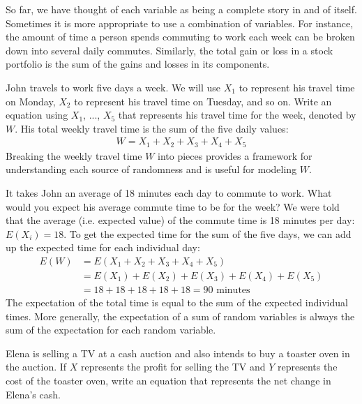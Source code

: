 So far, we have thought of each variable as being a complete story in and of itself. Sometimes it is more appropriate to use a combination of variables. For instance, the amount of time a person spends commuting to work each week can be broken down into several daily commutes. Similarly, the total gain or loss in a stock portfolio is the sum of the gains and losses in its components.

\begin{examplewrap}
\begin{nexample}{John travels to work five days a week. We will use $X_1$ to represent his travel time on Monday, $X_2$ to represent his travel time on Tuesday, and so on. Write an equation using $X_1$, ..., $X_5$ that represents his travel time for the week, denoted by $W$.}
His total weekly travel time is the sum of the five daily values:
\begin{align*}
W = X_1 + X_2 + X_3 + X_4 + X_5
\end{align*}
Breaking the weekly travel time $W$ into pieces provides a framework for understanding each source of randomness and is useful for modeling $W$.
\end{nexample}
\end{examplewrap}

\D{\newpage}

\begin{examplewrap}
\begin{nexample}{It takes John an average of 18 minutes each day to commute to work. What would you expect his average commute time to be for the week?}
We were told that the average (i.e. expected value) of the commute time is 18 minutes per day: $E(X_i) = 18$. To get the expected time for the sum of the five days, we can add up the expected time for each individual day:
\begin{align*}
E(W) &= E(X_1 + X_2 + X_3 + X_4 + X_5) \\
	&= E(X_1) + E(X_2) + E(X_3) + E(X_4) + E(X_5) \\
	&= 18 + 18 + 18 + 18 + 18 = 90\text{ minutes}
\end{align*}
The expectation of the total time is equal to the sum of the expected individual times. More generally, the expectation of a sum of random variables is always the sum of the expectation for each random variable.
\end{nexample}
\end{examplewrap}

\begin{exercisewrap}
\begin{nexercise}
\label{elenaIsSellingATVAndBuyingAToasterOvenAtAnAuction}%
Elena is selling a TV at a cash auction and also intends to buy a toaster oven in the auction. If $X$ represents the profit for selling the TV and $Y$ represents the cost of the toaster oven, write an equation that represents the net change in Elena's cash.\footnotemark
\end{nexercise}
\end{exercisewrap}

